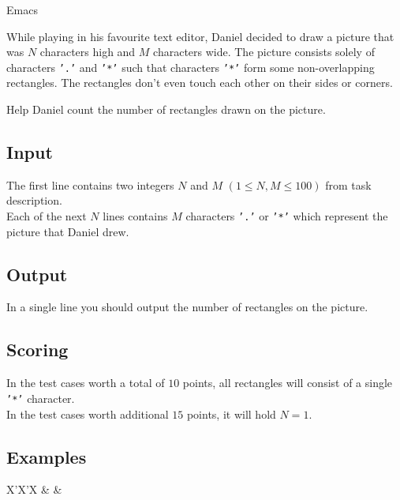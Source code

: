 \begin{statement}[
  problempoints=50,
  timelimit=1 second,
  memorylimit=512 MiB,
]{Emacs}


While playing in his favourite text editor, Daniel decided to draw a picture
that was $N$ characters high and $M$ characters wide. The picture consists
solely of characters \texttt{'.'} and \texttt{'*'} such that characters
\texttt{'*'} form some non-overlapping rectangles. The rectangles don't even
touch each other on their sides or corners.

Help Daniel count the number of rectangles drawn on the picture.

\subsection*{Input}
The first line contains two integers $N$ and $M$ $(1 \le N, M \le 100)$ from
task description. \\
Each of the next $N$ lines contains $M$ characters \texttt{'.'} or
\texttt{'*'} which represent the picture that Daniel drew.

\subsection*{Output}
In a single line you should output the number of rectangles on the picture.

\subsection*{Scoring}
In the test cases worth a total of $10$ points, all rectangles will consist
of a single \texttt{'*'} character.\\
In the test cases worth additional $15$ points, it will hold $N = 1$.

\subsection*{Examples}
\begin{tabularx}{\textwidth}{X'X'X}
 &
 &
\end{tabularx}

\end{statement}

